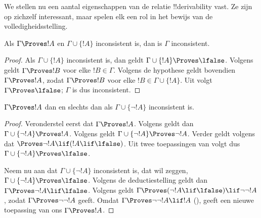 \documentclass[openany]{memoir}
\begin{document}
\begingroup
\def\olfilename{OLP-0121}
\def\olfilepath{content/first-order-logic/axiomatic-deduction/}
\hypertarget{unit-OLP-0121}{}



      {}
      {}


We stellen nu een aantal eigenschappen van de relatie
!!{derivability} vast. Ze zijn op zichzelf interessant, maar spelen elk
een rol in het bewijs van de volledigheidsstelling.

\begin{prop}
  Als $\Gamma \Proves !A$ en $\Gamma \cup \{!A\}$ inconsistent is,
  dan is $\Gamma$ inconsistent.
\end{prop}

\begin{proof}
  Als $\Gamma \cup \{!A\}$ inconsistent is, dan geldt $\Gamma \cup
  \{!A\} \Proves \lfalse$. Volgens
   geldt $\Gamma \Proves !B$ voor elke
  $!B \in \Gamma$. Volgens de hypothese geldt bovendien $\Gamma
  \Proves !A$, zodat $\Gamma \Proves !B$ voor elke $!B \in \Gamma
  \cup \{!A\}$. Uit  volgt $\Gamma
  \Proves \lfalse$; $\Gamma$ is dus inconsistent.
\end{proof}

\begin{prop}
$\Gamma \Proves !A$ dan en slechts dan als $\Gamma \cup \{\lnot
!A\}$ inconsistent is.
\end{prop}

\begin{proof}
Veronderstel eerst dat $\Gamma \Proves !A$. Volgens
 geldt dan $\Gamma \cup \{\lnot !A\}
\Proves !A$. Volgens  geldt $\Gamma \cup
\{\lnot !A\} \Proves \lnot !A$. Verder geldt volgens
 dat $\Proves \lnot !A \lif (!A \lif \lfalse)$.
Uit twee toepassingen van  volgt dus $\Gamma \cup
\{\lnot !A\} \Proves \lfalse$.

Neem nu aan dat $\Gamma \cup \{\lnot !A\}$ inconsistent is, dat wil
zeggen, $\Gamma \cup \{\lnot !A\} \Proves \lfalse$. Volgens de
deductiestelling geldt dan $\Gamma \Proves \lnot !A \lif \lfalse$.
Volgens  geldt $\Gamma \Proves (\lnot !A \lif
\lfalse) \lif \lnot\lnot !A$, zodat  $\Gamma
\Proves \lnot\lnot !A$ geeft. Omdat $\Gamma \Proves \lnot\lnot !A
\lif !A$ (), geeft een nieuwe toepassing van
 ons $\Gamma \Proves !A$.
\end{proof}
\end{document}
